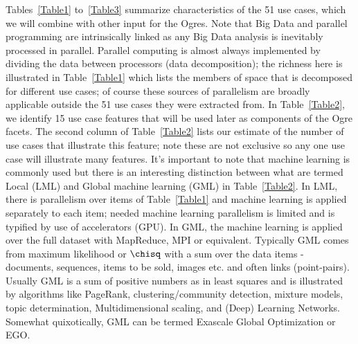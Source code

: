 \documentclass{acm_proc_article-sp}
\begin{document}
Tables~\ref{Table1} to~\ref{Table3} summarize characteristics of the 51 use cases, which we will combine with other input for the Ogres. Note that Big Data and parallel programming are intrinsically linked as any Big Data analysis is inevitably processed in parallel. Parallel computing is almost always implemented by dividing the data between processors (data decomposition); the richness here is illustrated in Table~\ref{Table1} which lists the members of space that is decomposed for different use cases; of course these sources of parallelism are broadly applicable outside the 51 use cases they were extracted from. In Table~\ref{Table2}, we identify 15 use case features that will be used later as components of the Ogre facets. The second column of Table~\ref{Table2} lists our estimate of the number of use cases that illustrate this feature; note these are not exclusive so any one use case will illustrate many features.
It's important to note that machine learning is commonly used but there is an interesting distinction between what are termed Local (LML) and Global machine learning (GML) in Table~\ref{Table2}. In LML, there is parallelism over items of Table~\ref{Table1} and machine learning is applied separately to each item; needed machine learning parallelism is limited and is typified by use of accelerators (GPU). In GML, the machine learning is applied over the full dataset with MapReduce, MPI or equivalent. Typically GML comes from maximum likelihood or $\chisq$ with a sum over the data items - documents, sequences, items to be sold, images etc. and often links (point-pairs). Usually GML is a sum of positive numbers as in least squares and is illustrated by algorithms like PageRank, clustering/community detection, mixture models, topic determination, Multidimensional scaling, and (Deep) Learning Networks. Somewhat quixotically, GML can be termed Exascale Global Optimization or EGO. 
\end{document}
